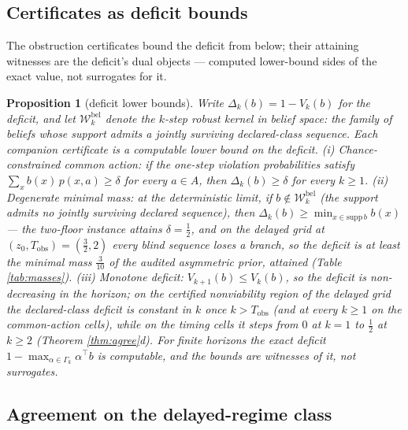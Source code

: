 \documentclass[10pt,twocolumn]{article}
\theoremstyle{plain}
\newtheorem{proposition}[theorem]{Proposition}
\theoremstyle{definition}
\theoremstyle{remark}
\begin{document}
\subsection{Certificates as deficit bounds}\label{deficit}

The obstruction certificates bound the deficit from below; their attaining
witnesses are the deficit's dual objects --- computed lower-bound sides of
the exact value, not surrogates for it.

\begin{proposition}[deficit lower bounds]\label{prop:deficit}
Write \(\Delta_{k}(b) = 1 - V_{k}(b)\) for the deficit, and let
\(\mathcal{W}^{\mathrm{bel}}_{k}\)
denote the \(k\)-step robust kernel in belief space: the family of beliefs
whose support admits a jointly surviving declared-class sequence. Each
companion certificate is a computable lower bound on the deficit.
(i) \emph{Chance-constrained common action:} if the one-step violation
probabilities satisfy \(\sum_{x} b(x)\, p(x, a) \ge \delta\) for every
\(a \in A\), then \(\Delta_{k}(b) \ge \delta\) for every \(k \ge 1\).
(ii) \emph{Degenerate minimal mass:} at the deterministic limit, if
\(b \notin \mathcal{W}^{\mathrm{bel}}_{k}\) (the support admits no jointly surviving declared
sequence), then \(\Delta_{k}(b) \ge \min_{x \in \mathrm{supp}\, b} b(x)\)
--- the two-floor instance attains \(\delta = \tfrac{1}{2}\), and on the
delayed grid at \((z_{0}, T_{\mathrm{obs}}) = (\tfrac{3}{2}, 2)\) every
blind sequence loses a branch, so the deficit is at least the minimal
mass \(\tfrac{3}{10}\) of the audited asymmetric prior, attained
(Table \ref{tab:masses}).
(iii) \emph{Monotone deficit:} \(V_{k+1}(b) \le V_{k}(b)\), so the
deficit is non-decreasing in the horizon; on the certified nonviability
region of the delayed grid the declared-class deficit is constant in
\(k\) once \(k > T_{\mathrm{obs}}\) (and at every \(k \ge 1\) on
the common-action cells), while on the timing cells it steps from
\(0\) at \(k = 1\) to \(\tfrac{1}{2}\) at \(k \ge 2\) (Theorem
\ref{thm:agree}d).
For finite horizons the exact deficit
\(1 - \max_{\alpha \in \Gamma_{k}} \alpha^{\top} b\) is computable, and
the bounds are witnesses of it, not surrogates.
\end{proposition}

\subsection{Agreement on the delayed-regime class}\label{agreement}
\end{document}
